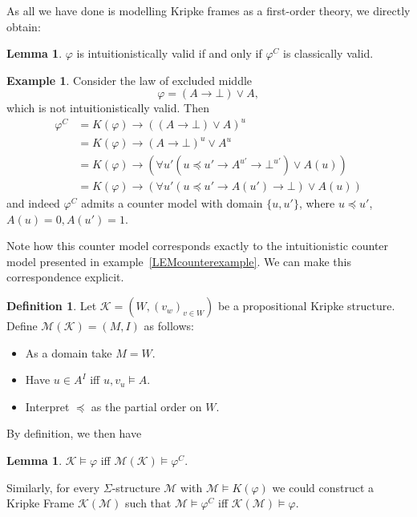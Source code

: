 \documentclass[a4paper,11pt]{report}
\theoremstyle{definition}
\theoremstyle{definition}
\theoremstyle{definition}
\newtheorem{lemma}[theorem]{Lemma}
\theoremstyle{definition}
\theoremstyle{definition}
\newtheorem{definition}[theorem]{Definition}
\theoremstyle{definition}
\newtheorem{example}[theorem]{Example}
\theoremstyle{definition}
\begin{document}
	\noindent As all we have done is modelling Kripke frames as a first-order theory, we directly obtain:
	
	\begin{lemma}
		$\varphi$ is intuitionistically valid if and only if $\varphi^C$ is classically valid.
	\end{lemma}

	\begin{example}
		Consider the law of excluded middle $$\varphi = (A\to \bot)\vee A,$$ which is not intuitionistically valid. Then
		\begin{align*}
			\varphi^{C} &= K(\varphi)\to ((A\to \bot)\vee A)^u\\
						 &= K(\varphi)\to (A\to \bot)^u\vee A^u\\
						 &= K(\varphi)\to (\forall u'( u\preceq u' \to A^{u'}\to \bot^{u'})\vee A(u))\\
						 &= K(\varphi)\to (\forall u' (u\preceq u' \to A(u')\to \bot)\vee A(u))
		\end{align*}
		and indeed $\varphi^{C}$ admits a counter model with domain $\{u, u'\}$, where $u \preceq u'$, $A(u) = 0, A(u') = 1$.
	\end{example}
	
	Note how this counter model corresponds exactly to the intuitionistic counter model presented in example~\ref{LEMcounterexample}. We can make this correspondence explicit.
	
	\begin{definition}
		Let $\mathcal K = (W, (v_w)_{v\in W})$ be a propositional Kripke structure. Define $\mathcal M(\mathcal K) = (M, I)$ as follows:
		\begin{itemize}
			\item As a domain take $M = W$.
			\item Have $u\in A^{I}$ iff $u, v_u\models A$.
			\item Interpret $\preceq$ as the partial order on $W$.
		\end{itemize}
	\end{definition}

	\noindent By definition, we then have
	\begin{lemma}
		$\mathcal K\models \varphi$ iff $\mathcal M(\mathcal K)\models \varphi^{C}$.
	\end{lemma}
	
	\indent Similarly, for every $\Sigma$-structure $\mathcal M$ with $\mathcal M\models K(\varphi)$ we could construct a Kripke Frame $\mathcal K(\mathcal M)$ such that $\mathcal M\models \varphi^C$ iff $\mathcal K(\mathcal M)\models \varphi$.
	
\end{document}
